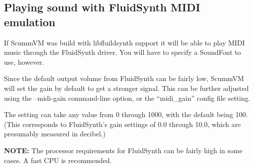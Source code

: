 

\subsection{Playing sound with FluidSynth MIDI emulation}

If ScummVM was build with libfluildsynth support it will be able to play MIDI
music through the FluidSynth driver. You will have to specify a SoundFont to
use, however.

Since the default output volume from FluidSynth can be fairly low, ScummVM will
set the gain by default to get a stronger signal. This can be further adjusted
using the --midi-gain command-line option, or the ``midi\_gain'' config file
setting.

The setting can take any value from 0 through 1000, with the default being 100.
(This corresponds to FluidSynth's gain settings of 0.0 through 10.0, which are
presumably measured in decibel.)

\textbf{NOTE:} The processor requirements for FluidSynth can be fairly high in
some cases. A fast CPU is recommended.
